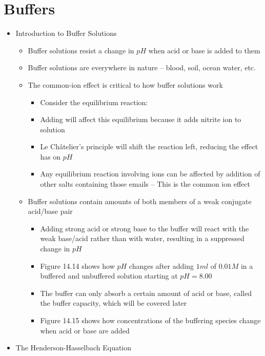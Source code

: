 \documentclass[12pt, openany, letterpaper]{memoir}
\begin{document}
\section{Buffers}
\begin{itemize}
  \item Introduction to Buffer Solutions
  \begin{itemize}
    \item Buffer solutions resist a change in $pH$ when acid or base is added to them
    \item Buffer solutions are everywhere in nature -- blood, soil, ocean water, etc.
    \item The common-ion effect is critical to how buffer solutions work
    \begin{itemize}
      \item Consider the equilibrium reaction: 
      \item Adding  will affect this equilibrium because it adds nitrite ion to solution
      \item Le Ch\^atelier's principle will shift the reaction left, reducing the effect  has on $pH$
      \item Any equilibrium reaction involving ions can be affected by addition of other salts containing those emails -- This is the common ion effect
    \end{itemize}
    \item Buffer solutions contain amounts of both members of a weak conjugate acid/base pair
    \begin{itemize}
      \item Adding strong acid or strong base to the buffer will react with the weak base/acid rather than with water, resulting in a suppressed change in $pH$
      \item Figure 14.14 shows how $pH$ changes after adding $1ml$ of $0.01M$  in a buffered and unbuffered solution starting at $pH=8.00$ 
      \item The buffer can only absorb a certain amount of acid or base, called the buffer capacity, which will be covered later
      \item Figure 14.15 shows how concentrations of the buffering species change when acid or base are added
    \end{itemize}
  \end{itemize}
  \item The Henderson-Hasselbach Equation
  \begin{itemize}

\end{itemize}
\end{itemize}
\end{document}
